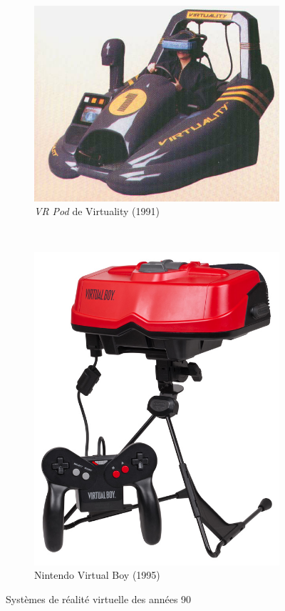 \documentclass[a4,12pt]{scrartcl}
\begin{document}
\begin{figure}[H]
	\centering
	\begin{subfigure}{.4\textwidth}
	  \centering
	  \includegraphics[width=\linewidth]{virtuality}
	  \caption{\emph{VR Pod} de Virtuality (1991)}
	\end{subfigure}
	~
	\begin{subfigure}{.4\textwidth}
	  \centering
	  \includegraphics[width=0.8\linewidth]{virtualboy}
	  \caption{Nintendo Virtual Boy (1995)}
	\end{subfigure}
 	\caption{Systèmes de réalité virtuelle des années 90}
\end{figure}
\end{document}
